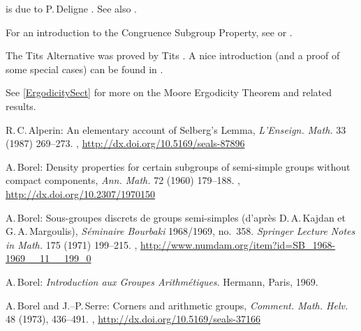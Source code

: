 \begin{notes}
 is due to P.\,Deligne \cite{Deligne-torsion}.
See also \cite{Raghunathan-torsion}.

For an introduction to the Congruence Subgroup Property, see \cite[Chap.~6]{Humphreys-ArithmeticGroups} or \cite{Sury-CSPBook}.

The Tits Alternative  was proved by
Tits \cite{Tits-TitsAlt}. A nice introduction (and a proof
of some special cases) can be found in
\cite{delaHarpe-TitsAlt}.

See \cref{ErgodicitySect} for more on the Moore Ergodicity Theorem  and related results.

\end{notes}


\begin{references}{99}

 R.\,C.\,Alperin:
 An elementary account of Selberg's Lemma,
 \emph{L'Enseign. Math.} 33 (1987) 269--273.
,
\maynewline
\url{http://dx.doi.org/10.5169/seals-87896}

 A.\,Borel:
 Density properties for certain subgroups of semi-simple
groups without compact components,
 \emph{Ann. Math.} 72 (1960) 179--188.
,
\maynewline
\url{http://dx.doi.org/10.2307/1970150}

A.\,Borel:
Sous-groupes discrets de groups semi-simples (d'apr\`es D.\,A.\,Kajdan et G.\,A.\,Margoulis),
\emph{S\'eminaire Bourbaki} 1968/1969, %
no.~358.
\emph{Springer Lecture Notes in Math.} 175 (1971) 199--215.
,
\maynewline
\url{http://www.numdam.org/item?id=SB_1968-1969__11__199_0}

A.\,Borel:
\emph{Introduction aux Groupes Arithm\'etiques}.
Hermann, Paris, 1969.
 
A.\,Borel and J.--P.\,Serre:
Corners and arithmetic groups,
\emph{Comment. Math. Helv.} 48 (1973), 436--491. 
 ,
 \maynewline
 \url{http://dx.doi.org/10.5169/seals-37166}
 


\end{references}
